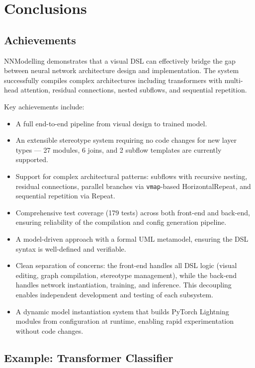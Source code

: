 \documentclass[11pt,a4paper]{article}
\begin{document}
\pagebreak

\section{Conclusions}

\subsection{Achievements}

NNModelling demonstrates that a visual DSL can effectively bridge the gap between neural network architecture design and implementation. The system successfully compiles complex architectures including transformers with multi-head attention, residual connections, nested subflows, and sequential repetition.

Key achievements include:
\begin{itemize}
	\item A full end-to-end pipeline from visual design to trained model.
	\item An extensible stereotype system requiring no code changes for new layer types --- 27 modules, 6 joins, and 2 subflow templates are currently supported.
	\item Support for complex architectural patterns: subflows with recursive nesting, residual connections, parallel branches via \texttt{vmap}-based HorizontalRepeat, and sequential repetition via Repeat.
	\item Comprehensive test coverage (179 tests) across both front-end and back-end, ensuring reliability of the compilation and config generation pipeline.
	\item A model-driven approach with a formal UML metamodel, ensuring the DSL syntax is well-defined and verifiable.
	\item Clean separation of concerns: the front-end handles all DSL logic (visual editing, graph compilation, stereotype management), while the back-end handles network instantiation, training, and inference. This decoupling enables independent development and testing of each subsystem.
	\item A dynamic model instantiation system that builds PyTorch Lightning modules from configuration at runtime, enabling rapid experimentation without code changes.
\end{itemize}

\pagebreak

\subsection{Example: Transformer Classifier}
\end{document}
